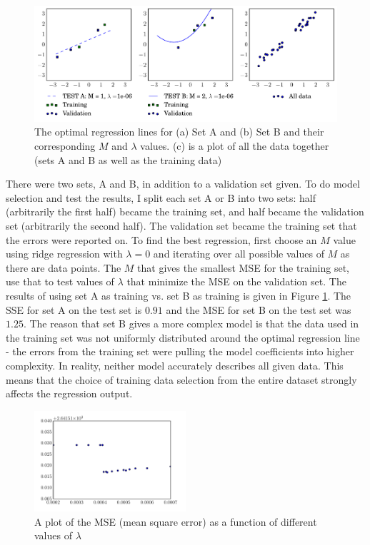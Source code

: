 \documentclass[10pt]{article}
\begin{document}
\begin{figure}[!ht]
	\centering
	\includegraphics[width=\textwidth]{exercise3-2-1.pdf}
	\caption{The optimal regression lines for (a) Set A and (b) Set B and their corresponding $M$ and $\lambda$ values. (c) is a plot of all the data together (sets A and B as well as the training data)}
	\label{fig:3-2}
\end{figure}

There were two sets, A and B, in addition to a validation set given. To do model selection and test the results, I split each set A or B into two sets: half (arbitrarily the first half) became the training set, and half became the validation set (arbitrarily the second half). The validation set became the training set that the errors were reported on. To find the best regression, first choose an $M$ value using ridge regression with $\lambda = 0$ and iterating over all possible values of $M$ as there are data points. The $M$ that gives the smallest MSE for the training set, use that to test values of $\lambda$ that minimize the MSE on the validation set. The results of using set A as training vs. set B as training is given in Figure \ref{fig:3-2}. The SSE for set A on the test set is $0.91$ and the MSE for set B on the test set was $1.25$. The reason that set B gives a more complex model is that the data used in the training set was not uniformly distributed around the optimal regression line - the errors from the training set were pulling the model coefficients into higher complexity. In reality, neither model accurately describes all given data. This means that the choice of training data selection from the entire dataset strongly affects the regression output.

\begin{figure}[!ht]
	\centering
	\includegraphics[width=0.5\textwidth]{exercise3-2-3.pdf}
	\caption{A plot of the MSE (mean square error) as a function of different values of $\lambda$}
	\label{fig:3-3}
\end{figure}
\end{document}
